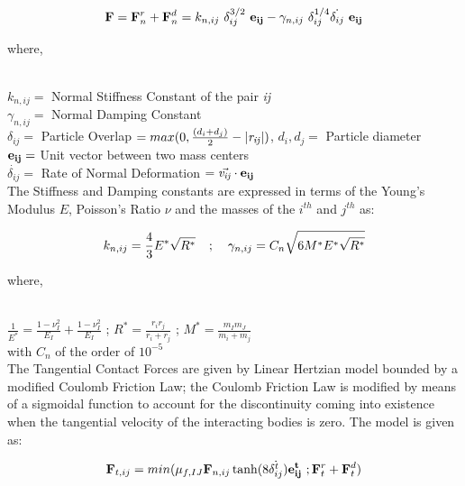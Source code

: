 \begin{eqnarray}
{\bf{F}} = {\bf{F}}_n^r + {\bf{F}}_n^d = k_{n,ij}~\delta _{ij}^{3/2}~{\bf{e_{ij}}} - \gamma _{n,ij} ~ \delta _{ij}^{1/4} \dot{\delta _{ij}}~\bf{e_{ij}}  
\end{eqnarray}

{\raggedright{where,}}\\
$k_{n,ij} = $ Normal Stiffness Constant of the pair \textit{ij}\\
$\gamma _{n,ij} = $ Normal Damping Constant\\
$\delta _{ij} = $ Particle Overlap $= max(0, \frac{(d_i + d_j)}{2} - {\bf{|{\it{r_{ij}}}|}})$, $d_i, d_j = $ Particle diameter\\
${\bf{e_{ij}}} = $ Unit vector between two mass centers\\
$\dot{\delta _{ij}} = $ Rate of Normal Deformation $= \vec{\it{v_{ij}}}\cdot {\bf{e_{ij}}}$\\

The Stiffness and Damping constants are expressed in terms of the Young's Modulus $E$, Poisson's Ratio $\nu$ and the masses of the $i^{th}$ and $j^{th}$ as:

\begin{eqnarray}
 k_{n,ij} = \frac{4}{3} E^* \sqrt{R^*} \hspace{0.375cm} ; \hspace{0.375cm} \gamma _{n,ij} = C_n \sqrt{6M^*E^* \sqrt{R^*}}
\end{eqnarray}

{\raggedright{where,}}\\
$\frac{1}{E^*} = \frac{1-\nu_I^2}{E_I}+\frac{1-\nu_I^2}{E_I}$ \hspace{0.375cm} ; \hspace{0.375cm} $R^* = \frac{r_i r_j}{r_i + r_j}$ \hspace{0.375cm} ; \hspace{0.375cm} $M^* = \frac{m_I m_J}{m_i + m_j}$\\
with $C_n$ of the order of $10^{-5}$\\


The Tangential Contact Forces are given by Linear Hertzian model bounded by a modified Coulomb Friction Law; the Coulomb Friction Law is modified by means of a sigmoidal function to account for the discontinuity coming into existence when the tangential velocity of the interacting bodies is zero\cite{vetsch}. The model is given as:

\begin{eqnarray}
 {\bf{F}}_{t,ij} = min(\mu_{f,IJ} {\bf{F}}_{n,ij}\tanh(8\dot{\delta^t_{ij}}){\bf{e^t_{ij}}}~; {\bf{F}}_t^r + {\bf{F}}_t^d)
\end{eqnarray}

